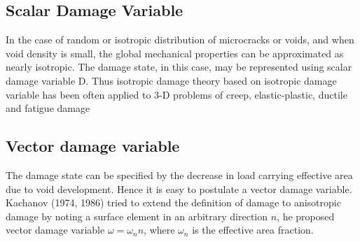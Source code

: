 \documentclass[a4paper,12pt,twoside]{report}
\begin{document}
\subsection{Scalar Damage Variable}
\indent\indent\indent In the case of random or isotropic distribution of microcracks or voids, and when void density is small, the global mechanical properties can be approximated as nearly isotropic. The damage state, in this case, may be represented using scalar damage variable D. Thus isotropic damage theory based on isotropic damage variable has been often applied to 3-D problems of creep, elastic-plastic, ductile and fatigue damage
\subsection{Vector damage variable}
\indent\indent\indent The damage state can be specified by the decrease in load carrying effective area due to void development. Hence it is easy to postulate a vector damage variable. Kachanov (1974, 1986) tried to extend the definition of damage to anisotropic damage by noting a surface element in an arbitrary direction $n$, he proposed vector damage variable $ \omega = \omega_{n}n$, where $\omega_{n}$ is the effective area fraction. 
\end{document}
